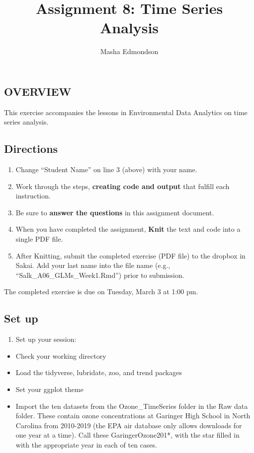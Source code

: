 \documentclass[]{article}
\title{Assignment 8: Time Series Analysis}
\author{Masha Edmondson}
\date{}
\providecommand{\tightlist}{%
  \setlength{\itemsep}{0pt}\setlength{\parskip}{0pt}}
\begin{document}
\maketitle

\hypertarget{overview}{%
\subsection{OVERVIEW}\label{overview}}

This exercise accompanies the lessons in Environmental Data Analytics on
time series analysis.

\hypertarget{directions}{%
\subsection{Directions}\label{directions}}

\begin{enumerate}
\def\labelenumi{\arabic{enumi}.}
\tightlist
\item
  Change ``Student Name'' on line 3 (above) with your name.
\item
  Work through the steps, \textbf{creating code and output} that fulfill
  each instruction.
\item
  Be sure to \textbf{answer the questions} in this assignment document.
\item
  When you have completed the assignment, \textbf{Knit} the text and
  code into a single PDF file.
\item
  After Knitting, submit the completed exercise (PDF file) to the
  dropbox in Sakai. Add your last name into the file name (e.g.,
  ``Salk\_A06\_GLMs\_Week1.Rmd'') prior to submission.
\end{enumerate}

The completed exercise is due on Tuesday, March 3 at 1:00 pm.

\hypertarget{set-up}{%
\subsection{Set up}\label{set-up}}

\begin{enumerate}
\def\labelenumi{\arabic{enumi}.}
\tightlist
\item
  Set up your session:
\end{enumerate}

\begin{itemize}
\tightlist
\item
  Check your working directory
\item
  Load the tidyverse, lubridate, zoo, and trend packages
\item
  Set your ggplot theme
\item
  Import the ten datasets from the Ozone\_TimeSeries folder in the Raw
  data folder. These contain ozone concentrations at Garinger High
  School in North Carolina from 2010-2019 (the EPA air database only
  allows downloads for one year at a time). Call these
  GaringerOzone201*, with the star filled in with the appropriate year
  in each of ten cases.
\end{itemize}
\end{document}
